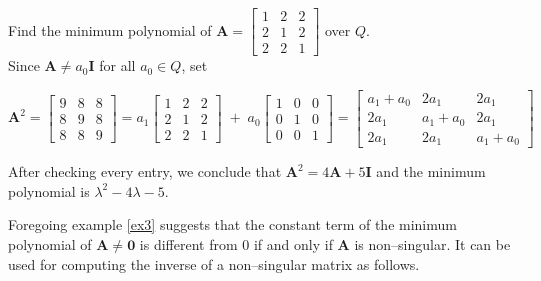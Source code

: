 \documentclass[a4paper,11pt]{article} %
\theoremstyle{plain} %
{\theorembodyfont{\normalfont}
\newtheorem{Exa}{Example}}
\newcommand{\matr}[1]{\mathbf{#1}}
\begin{document}
\begin{Exa}\label{ex3}
Find the minimum polynomial of $\matr{A} = \left[
\begin{array}{ccc} 1 & 2 & 2\\
2 & 1 & 2 \\ 2 & 2 & 1 \end{array} \right]$ over $Q$. \\ %

Since $\matr{A} \neq a_0\matr{I}$ for all $a_0 \in Q$, set%

\vspace{0.5\baselineskip} %

     $\matr{A}^2 = \left[ \begin{array}{ccc}
            9 & 8 & 8 \\
            8 & 9 & 8 \\
            8 & 8 & 9
       \end{array} \right]
        = a_1 \! \left[ \begin{array}{ccc}
            1 & 2 & 2 \\
            2 & 1 & 2 \\
            2 & 2 & 1
       \end{array} \right]
       \; + \; a_0 \! \left[\begin{array}{ccc}
            1 & 0 & 0 \\
            0 & 1 & 0 \\
            0 & 0 & 1
       \end{array}\right]
       = \left[ \begin{array}{ccc}
            a_1\!+\!a_0 & 2a_1 & 2a_1 \\
            2a_1 & a_1\!+\!a_0 & 2a_1\\
            2a_1 & 2a_1 & a_1\!+\!a_0
       \end{array} \right]$

\vspace{0.5\baselineskip}

After checking every entry, we conclude that $\matr{A}^2 = 4\matr{A} + 5\matr{I}$ and the minimum polynomial is ${\lambda}^2 -4\lambda - 5$.

\end{Exa}

Foregoing example \ref{ex3} suggests that the constant term of the minimum polynomial of $\matr{A} \neq \matr{0}$ is different from $0$ if and only if $\matr{A}$ is non--singular. It can be used for computing the inverse
of a non--singular matrix as follows.
\end{document}
